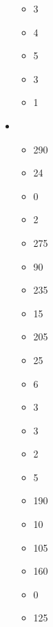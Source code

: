 \begin{multicols}{2}
\begin{itemize}
\begin{itemize}
\item \infernalwarriors{} \gw{} 3 
\item \citadelguardSINGULAR{} \pistol{} \wordand{} \spear{} 4 
\item \vassallevies{} \extramodel{} 5 
\item \vassallevies{} \bow{} 3 
\item \shackledslaves{} \shield{} 1 
	\end{itemize}
	\item \specialTYPE
	\begin{itemize}
\item \immortals{} \basecost{} 290 
\item \immortals{} \extramodel{} 24 
\item \immortals{} \gw{} 0 
\item \immortals{} \infernalweapon{} 2 
\item \kadimincarnates{} \basecost{} 275 
\item \kadimincarnates{} \extramodel{} 90 
\item \kadimchariot{} \basecost{} 235 
\item \kadimchariot{} \gw{} 15 
\item \taurukhenforcers{} \basecost{} 205 
\item \taurukhenforcers{} \extramodel{} 25 
\item \taurukhenforcers{} \blunderbuss{} 6 
\item \taurukhenforcers{} \gw{} 3 
\item \taurukhenforcers{} \infernalweapon{} 3 
\item \taurukhanointedSINGULAR{} \pw{} 2 
\item \taurukhanointedSINGULAR{} \gw{} 5 
\item \vassalcavalry{} \basecost{} 190 
\item \vassalcavalry{} \extramodel{} 10 
\item \vassalslingshot{} \basecost{} 105 
\item \gunneryteam{} \basecost{} 160 
\item \gunneryteam{} \naphthathrower{} 0 
\item \infernalartillery{} \titanmortar{} 125 
	\end{itemize}

\end{itemize}
\end{multicols}
